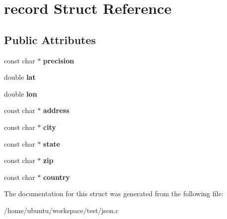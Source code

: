 \hypertarget{structrecord}{\section{record Struct Reference}
\label{structrecord}
}
\subsection*{Public Attributes}
\begin{DoxyCompactItemize}
\item 
\hypertarget{structrecord_a1a2c753f8662ba3b36c6724bd68a79e6}{const char $\ast$ {\bfseries precision}}\label{structrecord_a1a2c753f8662ba3b36c6724bd68a79e6}

\item 
\hypertarget{structrecord_aead5d6a207526cb625d716c030fa3d4d}{double {\bfseries lat}}\label{structrecord_aead5d6a207526cb625d716c030fa3d4d}

\item 
\hypertarget{structrecord_a36c8c25419ba59e1288560da3dd6bfd0}{double {\bfseries lon}}\label{structrecord_a36c8c25419ba59e1288560da3dd6bfd0}

\item 
\hypertarget{structrecord_abfdcc46d8017e680b8dc1bc373cc988e}{const char $\ast$ {\bfseries address}}\label{structrecord_abfdcc46d8017e680b8dc1bc373cc988e}

\item 
\hypertarget{structrecord_a14039bf4a0520076003f1494832f7776}{const char $\ast$ {\bfseries city}}\label{structrecord_a14039bf4a0520076003f1494832f7776}

\item 
\hypertarget{structrecord_a5c25c1774d401255c03eddb9476bd3f4}{const char $\ast$ {\bfseries state}}\label{structrecord_a5c25c1774d401255c03eddb9476bd3f4}

\item 
\hypertarget{structrecord_a351a82e368a89d7ff90ef9ece2520aa8}{const char $\ast$ {\bfseries zip}}\label{structrecord_a351a82e368a89d7ff90ef9ece2520aa8}

\item 
\hypertarget{structrecord_afcec0e174404ecb1d9f60b0796bdb316}{const char $\ast$ {\bfseries country}}\label{structrecord_afcec0e174404ecb1d9f60b0796bdb316}

\end{DoxyCompactItemize}


The documentation for this struct was generated from the following file\-:\begin{DoxyCompactItemize}
\item 
/home/ubuntu/workspace/test/json.\-c\end{DoxyCompactItemize}
